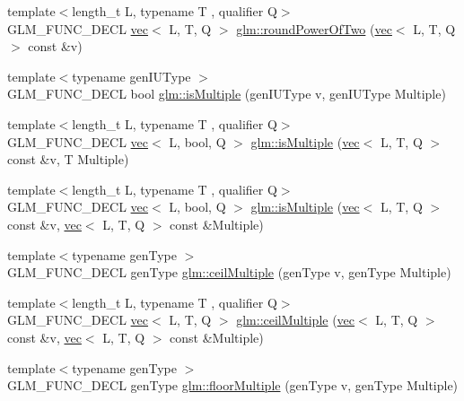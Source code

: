\begin{DoxyCompactItemize}
\item 
{\footnotesize template$<$length\+\_\+t L, typename T , qualifier Q$>$ }\\G\+L\+M\+\_\+\+F\+U\+N\+C\+\_\+\+D\+E\+CL \hyperlink{structglm_1_1vec}{vec}$<$ L, T, Q $>$ \hyperlink{group__gtc__round_ga258802a7d55c03c918f28cf4d241c4d0}{glm\+::round\+Power\+Of\+Two} (\hyperlink{structglm_1_1vec}{vec}$<$ L, T, Q $>$ const \&v)
\item 
{\footnotesize template$<$typename gen\+I\+U\+Type $>$ }\\G\+L\+M\+\_\+\+F\+U\+N\+C\+\_\+\+D\+E\+CL bool \hyperlink{group__gtc__round_gaec593d33956a8fe43f78fccc63ddde9a}{glm\+::is\+Multiple} (gen\+I\+U\+Type v, gen\+I\+U\+Type Multiple)
\item 
{\footnotesize template$<$length\+\_\+t L, typename T , qualifier Q$>$ }\\G\+L\+M\+\_\+\+F\+U\+N\+C\+\_\+\+D\+E\+CL \hyperlink{structglm_1_1vec}{vec}$<$ L, bool, Q $>$ \hyperlink{group__gtc__round_ga354caf634ef333d9cb4844407416256a}{glm\+::is\+Multiple} (\hyperlink{structglm_1_1vec}{vec}$<$ L, T, Q $>$ const \&v, T Multiple)
\item 
{\footnotesize template$<$length\+\_\+t L, typename T , qualifier Q$>$ }\\G\+L\+M\+\_\+\+F\+U\+N\+C\+\_\+\+D\+E\+CL \hyperlink{structglm_1_1vec}{vec}$<$ L, bool, Q $>$ \hyperlink{group__gtc__round_gabb4360e38c0943d8981ba965dead519d}{glm\+::is\+Multiple} (\hyperlink{structglm_1_1vec}{vec}$<$ L, T, Q $>$ const \&v, \hyperlink{structglm_1_1vec}{vec}$<$ L, T, Q $>$ const \&Multiple)
\item 
{\footnotesize template$<$typename gen\+Type $>$ }\\G\+L\+M\+\_\+\+F\+U\+N\+C\+\_\+\+D\+E\+CL gen\+Type \hyperlink{group__gtc__round_ga1d89ac88582aaf4d5dfa5feb4a376fd4}{glm\+::ceil\+Multiple} (gen\+Type v, gen\+Type Multiple)
\item 
{\footnotesize template$<$length\+\_\+t L, typename T , qualifier Q$>$ }\\G\+L\+M\+\_\+\+F\+U\+N\+C\+\_\+\+D\+E\+CL \hyperlink{structglm_1_1vec}{vec}$<$ L, T, Q $>$ \hyperlink{group__gtc__round_gab77fdcc13f8e92d2e0b1b7d7aeab8e9d}{glm\+::ceil\+Multiple} (\hyperlink{structglm_1_1vec}{vec}$<$ L, T, Q $>$ const \&v, \hyperlink{structglm_1_1vec}{vec}$<$ L, T, Q $>$ const \&Multiple)
\item 
{\footnotesize template$<$typename gen\+Type $>$ }\\G\+L\+M\+\_\+\+F\+U\+N\+C\+\_\+\+D\+E\+CL gen\+Type \hyperlink{group__gtc__round_ga2ffa3cd5f2ea746ee1bf57c46da6315e}{glm\+::floor\+Multiple} (gen\+Type v, gen\+Type Multiple)

\end{DoxyCompactItemize}
